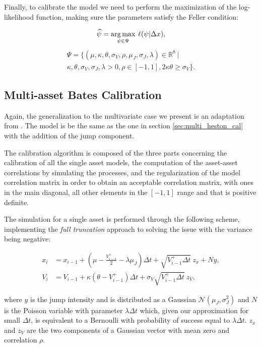 Finally, to calibrate the model we need to perform the maximization of the log-likelihood function, making sure the parameters satisfy the Feller condition:

\begin{equation}
\widehat{\psi} = \operatorname*{arg\,max}_{\psi \in \Psi} \:\ell(\psi |  \Delta x),
\end{equation}
\begin{multline}
\Psi = \{ (\mu, \kappa, \theta, \sigma_V, \rho, \mu_J, \sigma_J, \lambda) \in \mathbb{R}^8 \: |\: \\
\kappa,\theta,\sigma_V,\sigma_J, \lambda >0, \rho \in [-1,1], 2\kappa\theta \geq \sigma_V \}.
\end{multline}

\subsection{Multi-asset Bates Calibration}
Again, the generalization to the multivariate case we present is an adaptation from \citep{PARSIMONIOUS2011}. The model is be the same as the one in section \ref{sec:multi_heston_cal} with the addition of the jump component.

The calibration algorithm is composed of the three parts concerning the calibration of all the single asset models, the  computation of the asset-asset correlations by simulating the processes, and the regularization of the model correlation matrix in order to obtain an acceptable correlation matrix, with ones in the main diagonal, all other elements in the $[-1,1]$ range and that is positive definite.

The simulation for a single asset is performed through the following scheme, implementing the \textit{full truncation} approach to solving the issue with the variance being negative:

\begin{subequations}
	\label{eq:bates_sim}
	\begin{align}
	x_i &= x_{i-1} + (\mu -  \frac{V_{i-1}^+}{2}- \lambda \mu_J)\Delta t + \sqrt{V_{i-1}^+ \Delta t} \:z_x + N y, \\
	V_i &= V_{i-1} + \kappa(\theta - V_{i-1}^+ )\Delta t + \sigma_V \sqrt{V_{i-1}^+ \Delta t} \: z_V,
	\end{align}
\end{subequations}

where $y$ is the jump intensity and is distributed as a Gaussian $\mathcal{N}(\mu_J, \sigma_J^2)$ and $N$ is the Poisson variable with parameter $\lambda \Delta t$ which, given our approximation for small $\Delta t$, is equivalent to a Bernoulli with probability of success equal to $\lambda \Delta t$. 
$z_x$ and $z_V$ are the two components of a Gaussian vector with mean zero and correlation $\rho$.

